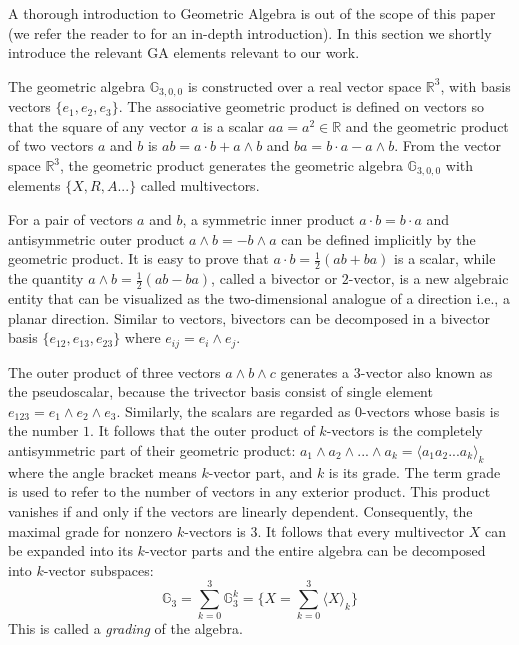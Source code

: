 \documentclass{birkjour}
\numberwithin{equation}{section}
\begin{document}
A thorough introduction to Geometric Algebra is out of the scope of this paper (we refer the reader to \cite{Dorst2007} for an in-depth introduction). In this section we shortly introduce the relevant GA elements relevant to our work. 

The geometric algebra $\mathbb{G}_{3,0,0}$ is constructed over a real vector space $\mathbb R^3$, with basis vectors $\{e_1, e_2, e_3\}$. The associative geometric product is defined on vectors so that the square of any vector $a$ is a scalar $a a = a^2 \in \mathbb{R}$ and the geometric product of two vectors $a$ and $b$ is $a b = a \cdot b + a \wedge b$ and $b a = b \cdot a - a \wedge b$. From the vector space $\mathbb R^3$, the geometric product generates the geometric algebra $\mathbb{G}_{3,0,0}$ with elements $\{ X, R, A...\}$ called multivectors.

For a pair of vectors $a$ and $b$, a symmetric inner product $a \cdot b = b \cdot a$ and antisymmetric outer product $a \wedge b = -b \wedge a$ can be defined implicitly by the geometric product. It is easy to prove that $a \cdot b = \frac{1}{2}(a b + b a)$ is a scalar, while the quantity $a \wedge b = \frac{1}{2}(a b - b a)$, called a bivector or $2$-vector, is a new algebraic entity that can be visualized as the two-dimensional analogue of a direction i.e., a planar direction. Similar to vectors, bivectors can be decomposed in a bivector basis $\{ e_{12}, e_{13}, e_{23} \}$ where $e_{ij} = e_i \wedge e_j$.

The outer product of three vectors $a \wedge b \wedge c$ generates a $3$-vector also known as the pseudoscalar, because the trivector basis consist of single element $e_{123} = e_1 \wedge e_2 \wedge e_3$. Similarly, the scalars are regarded as $0$-vectors whose basis is the number $1$. It follows that the outer product of $k$-vectors is the completely antisymmetric part of their geometric product: $a_1 \wedge a_2 \wedge ... \wedge a_k = \langle a_1 a_2 ... a_k \rangle_k$ where the angle bracket means $k$-vector part, and $k$ is its grade. The term grade is used to refer to the number of vectors in any exterior product. This product vanishes if and only if the vectors are linearly dependent. Consequently, the maximal grade for nonzero $k$-vectors is $3$. It follows that every multivector $X$ can be expanded into its $k$-vector parts and the entire algebra can be decomposed into $k$-vector subspaces:
\begin{equation*}
\mathbb G_3 = \sum_{k=0}^3{\mathbb{G}^k_3} = \{ X = \sum_{k=0}^3 { \langle X \rangle_k } \}
\end{equation*}
This is called a \emph{grading} of the algebra. 
\end{document}
